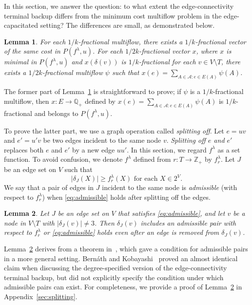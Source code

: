 \documentclass{article}
\newtheorem{lemma}{Lemma}
\newcommand{\Afam}{\mathcal{A}}
\newcommand{\Zset}{\mathbb{Z}}
\newcommand{\Rset}{\mathbb{Q}}
\newcommand{\cut}{P}
\newcommand{\g}{f^{\lambda}}
\begin{document}
In this section,
we answer the question: to what extent 
the edge-connectivity terminal backup differs from the 
minimum cost multiflow problem in the edge-capacitated setting?
The differences are small, as demonstrated below.

\begin{lemma}\label{lem.fractionality}
For each $1/k$-fractional multiflow, 
there exists a $1/k$-fractional vector of the same cost in $\cut(\g,u)$.
For each $1/2k$-fractional vector $x$, where
$x$ is minimal in $\cut(\g,u)$ and 
$x(\delta(v))$ is $1/k$-fractional for each $v \in V \setminus T$, there exists a $1/2k$-fractional
multiflow $\psi$
such that $x(e)=\sum_{A \in \Afam \colon e \in E(A)}\psi(A)$.
\end{lemma}

The former part of Lemma~\ref{lem.fractionality} is straightforward to prove;
if $\psi$ is a $1/k$-fractional multiflow,
then $x \colon E \rightarrow \Rset_+$ defined by $x(e)=\sum_{A \in \Afam \colon e \in E(A)} \psi(A)$
is $1/k$-fractional and belongs to $\cut(\g,u)$.

To prove the latter part, we use a graph operation called \emph{splitting off}.
Let $e=uv $ and $e'=u'v$ be two edges incident to the same node $v$.
\emph{Splitting off $e$ and $e'$} replaces both $e$ and $e'$ by a new edge $uu'$.
In this section, we regard $\g$ as a set function.
To avoid confusion, we denote $\g$ defined from $r \colon T \rightarrow \Zset_+$ by $\g_r$.
Let $J$ be an edge set on $V$ such that 
\begin{equation}\label{eq:admissible}
|\delta_J(X)|\geq \g_r(X)
\text{ for each } X \in 2^V.
\end{equation}
We say that a pair of edges in $J$ incident to the same node is \emph{admissible} (with respect
to $\g_r$)
when \eqref{eq:admissible} holds
after splitting off the edges.

\begin{lemma}\label{lem.admissible-splitting}
Let $J$ be an edge set on $V$ that satisfies \eqref{eq:admissible},
and let $v$ be a node in $V\setminus T$ with $|\delta_J(v)|\neq 3$.
Then $\delta_J(v)$ includes 
an admissible pair with respect to $\g_r$ or 
\eqref{eq:admissible} holds even after an edge is removed from $\delta_J(v)$.
\end{lemma}

Lemma~\ref{lem.admissible-splitting} derives from a theorem in~\cite{Nutov2009,Bernath2012},
which gave a condition for admissible pairs in a more general setting.
Bern{\'a}th and Kobayashi~\cite{Bernath2014} 
proved an almost identical claim when discussing the degree-specified version
of the edge-connectivity terminal backup, but did not explicitly specify 
the condition under which admissible pairs can exist.
For completeness, we provide a proof of
Lemma~\ref{lem.admissible-splitting} in Appendix~\ref{sec:splitting}.
\end{document}
